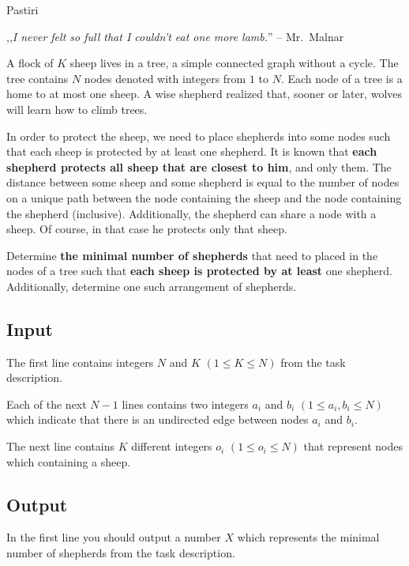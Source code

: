 \begin{statement}[
  problempoints=100,
  timelimit=1 second,
  memorylimit=512 MiB,
]{Pastiri}

,,\textit{I never felt so full that I couldn't eat one more lamb.}'' --
Mr.\ Malnar

A flock of $K$ sheep lives in a tree, a simple connected graph without
a cycle. The tree contains $N$ nodes denoted with integers from $1$ to $N$.
Each node of a tree is a home to at most one sheep. A wise shepherd realized
that, sooner or later, wolves will learn how to climb trees.

In order to protect the sheep, we need to place shepherds into some nodes
such that each sheep is protected by at least one shepherd. It is known that
\textbf{each shepherd protects all sheep that are closest to him}, and only them.
The distance between some sheep and some shepherd is equal to the number of
nodes on a unique path between the node containing the sheep and the node
containing the shepherd (inclusive). Additionally, the shepherd can share a
node with a sheep. Of course, in that case he protects only that sheep.

Determine \textbf{the minimal number of shepherds} that need to placed in
the nodes of a tree such that \textbf{each sheep is protected by at least}
one shepherd. Additionally, determine one such arrangement of shepherds.

\subsection*{Input}
The first line contains integers $N$ and $K$ $(1 \le K \le N)$ from the task
description.

Each of the next $N-1$ lines contains two integers $a_i$ and $b_i$ $(1 \le
a_i, b_i \le N)$ which indicate that there is an undirected edge between
nodes $a_i$ and $b_i$.

The next line contains $K$ different integers $o_i$ $(1 \le o_i \le N)$ that
represent nodes which containing a sheep.

\subsection*{Output}
In the first line you should output a number $X$ which represents the minimal
number of shepherds from the task description.


\end{statement}
